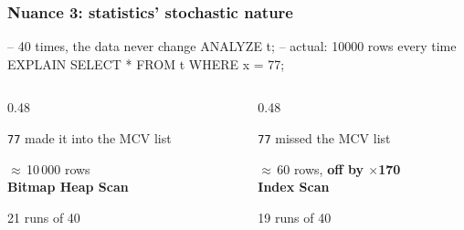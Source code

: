 \documentclass{beamer}
\newcommand\kw[1]{\textcolor{pgblue}{#1}}       %
\newcommand\sqlnum[1]{\textcolor{ptoaccent}{#1}} %
\newcommand\sqlcmt[1]{\textcolor{planfade}{#1}}  %
\begin{document}
\begin{frame}[fragile]\frametitle{Nuance 3: statistics' stochastic nature}
\vspace{-0.3em}
\begin{sql}[fontsize=\small]
\sqlcmt{-- 40 times, the data never change}
\kw{ANALYZE} t;
\sqlcmt{-- actual: 10000 rows every time}
\kw{EXPLAIN} \kw{SELECT} * \kw{FROM} t \kw{WHERE} x = \sqlnum{77};
\end{sql}
\vspace{0.6em}
\begin{columns}[T,onlytextwidth]

\begin{column}{0.48\textwidth}
\begin{tcolorbox}[enhanced, arc=3pt, colback=paper, colframe=ptoink,
  boxrule=0.6pt, left=8pt, right=8pt, top=6pt, bottom=6pt,
  before skip=0pt, after skip=0pt, equal height group=stoch]
\small\color{ptoink}
\texttt{77} made it into the MCV list

\medskip
{\Large $\approx$\,10\,000} rows\\[2pt]
\textbf{Bitmap Heap Scan}

\medskip
{\scriptsize\color{black!55}21 runs of 40}
\end{tcolorbox}
\end{column}

\begin{column}{0.48\textwidth}
\begin{tcolorbox}[enhanced, arc=3pt, colback=paper, colframe=ptoink,
  boxrule=0.6pt, left=8pt, right=8pt, top=6pt, bottom=6pt,
  before skip=0pt, after skip=0pt, equal height group=stoch]
\small\color{ptoink}
\texttt{77} missed the MCV list

\medskip
{\Large $\approx$\,60} rows, \textcolor{crash}{\textbf{off by $\times$170}}\\[2pt]
\textbf{Index Scan}

\medskip
{\scriptsize\color{black!55}19 runs of 40}
\end{tcolorbox}
\end{column}

\end{columns}

\vfill
\end{frame}

\end{document}
